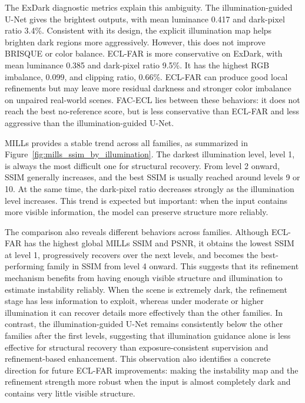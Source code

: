 The ExDark diagnostic metrics explain this ambiguity. The illumination-guided U-Net gives the brightest outputs, with mean luminance 0.417 and dark-pixel ratio 3.4\%. Consistent with its design, the explicit illumination map helps brighten dark regions more aggressively. However, this does not improve BRISQUE or color balance. ECL-FAR is more conservative on ExDark, with mean luminance 0.385 and dark-pixel ratio 9.5\%. It has the highest RGB imbalance, 0.099, and clipping ratio, 0.66\%. ECL-FAR can produce good local refinements but may leave more residual darkness and stronger color imbalance on unpaired real-world scenes. FAC-ECL lies between these behaviors: it does not reach the best no-reference score, but is less conservative than ECL-FAR and less aggressive than the illumination-guided U-Net.

MILLs provides a stable trend across all families, as summarized in Figure~\ref{fig:mills_ssim_by_illumination}. The darkest illumination level, level 1, is always the most difficult one for structural recovery. From level 2 onward, SSIM generally increases, and the best SSIM is usually reached around levels 9 or 10. At the same time, the dark-pixel ratio decreases strongly as the illumination level increases. This trend is expected but important: when the input contains more visible information, the model can preserve structure more reliably.

The comparison also reveals different behaviors across families. Although ECL-FAR has the highest global MILLs SSIM and PSNR, it obtains the lowest SSIM at level 1, progressively recovers over the next levels, and becomes the best-performing family in SSIM from level 4 onward. This suggests that its refinement mechanism benefits from having enough visible structure and illumination to estimate instability reliably. When the scene is extremely dark, the refinement stage has less information to exploit, whereas under moderate or higher illumination it can recover details more effectively than the other families. In contrast, the illumination-guided U-Net remains consistently below the other families after the first levels, suggesting that illumination guidance alone is less effective for structural recovery than exposure-consistent supervision and refinement-based enhancement. This observation also identifies a concrete direction for future ECL-FAR improvements: making the instability map and the refinement strength more robust when the input is almost completely dark and contains very little visible structure.


